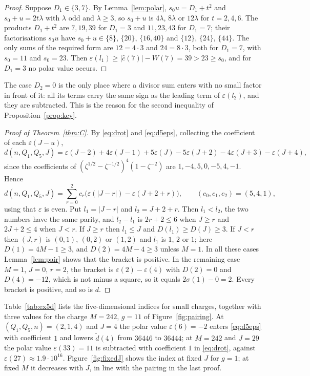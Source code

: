 \documentclass[11pt]{amsart}
\theoremstyle{definition}
\newcommand{\cc}{\hat c}
\newcommand{\dt}{\tilde d}
\begin{document}
\begin{proof}
Suppose $D_1\in\{3,7\}$. By Lemma~\ref{lem:polar}, $s_0u=D_1+t^2$ and $s_0+u=2t\lambda$ with $\lambda$ odd and $\lambda\ge3$, so $s_0+u$ is $4\lambda$, $8\lambda$ or $12\lambda$ for $t=2,4,6$. The products $D_1+t^2$ are $7,19,39$ for $D_1=3$ and $11,23,43$ for $D_1=7$; their factorisations $s_0u$ have $s_0+u\in\{8\}$, $\{20\}$, $\{16,40\}$ and $\{12\}$, $\{24\}$, $\{44\}$. The only sums of the required form are $12=4\cdot3$ and $24=8\cdot3$, both for $D_1=7$, with $s_0=11$ and $s_0=23$. Then $\varepsilon(l_1)\ge|\cc(7)|-W(7)=39>23\ge s_0$, and for $D_1=3$ no polar value occurs.
\end{proof}

The case $D_2=0$ is the only place where a divisor sum enters with no small factor in front of it: all its terms carry the same sign as the leading term of $\varepsilon(l_2)$, and they are subtracted. This is the reason for the second inequality of Proposition~\ref{prop:key}.

\begin{proof}[Proof of Theorem~\ref{thm:C}]
By \eqref{eq:drot} and \eqref{eq:d5eps}, collecting the coefficient of each $\varepsilon(J-u)$,
\[
d(n,Q_1,Q_5,J)=\varepsilon(J-2)+4\varepsilon(J-1)+5\varepsilon(J)-5\varepsilon(J+2)-4\varepsilon(J+3)-\varepsilon(J+4),
\]
since the coefficients of $(\zeta^{1/2}-\zeta^{-1/2})^4(1-\zeta^{-2})$ are $1,-4,5,0,-5,4,-1$. Hence
\[
d(n,Q_1,Q_5,J)=\sum_{r=0}^{2}c_r\bigl(\varepsilon(|J-r|)-\varepsilon(J+2+r)\bigr),\qquad (c_0,c_1,c_2)=(5,4,1),
\]
using that $\varepsilon$ is even. Put $l_1=|J-r|$ and $l_2=J+2+r$. Then $l_1<l_2$, the two numbers have the same parity, and $l_2-l_1$ is $2r+2\le6$ when $J\ge r$ and $2J+2\le4$ when $J<r$. If $J\ge r$ then $l_1\le J$ and $D(l_1)\ge D(J)\ge3$. If $J<r$ then $(J,r)$ is $(0,1)$, $(0,2)$ or $(1,2)$ and $l_1$ is $1$, $2$ or $1$; here $D(1)=4M-1\ge3$, and $D(2)=4M-4\ge3$ unless $M=1$. In all these cases Lemma~\ref{lem:pair} shows that the bracket is positive. In the remaining case $M=1$, $J=0$, $r=2$, the bracket is $\varepsilon(2)-\varepsilon(4)$ with $D(2)=0$ and $D(4)=-12$, which is not minus a square, so it equals $2\sigma(1)-0=2$. Every bracket is positive, and so is $d$.
\end{proof}

Table~\ref{tab:ex5d} lists the five-dimensional indices for small charges, together with three values for the charge $M=242$, $g=11$ of Figure~\ref{fig:pairing}. At $(Q_1,Q_5,n)=(2,1,4)$ and $J=4$ the polar value $\varepsilon(6)=-2$ enters \eqref{eq:d5eps} with coefficient $1$ and lowers $\dt(4)$ from $36446$ to $36444$; at $M=242$ and $J=29$ the polar value $\varepsilon(33)=11$ is subtracted with coefficient $1$ in \eqref{eq:drot}, against $\varepsilon(27)\approx1.9\cdot10^{16}$. Figure~\ref{fig:fixedJ} shows the index at fixed $J$ for $g=1$; at fixed $M$ it decreases with $J$, in line with the pairing in the last proof.
\end{document}
